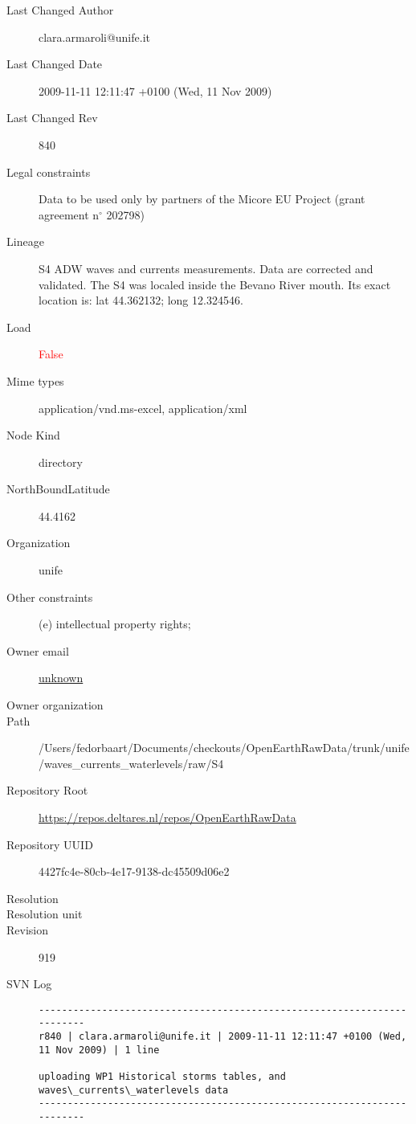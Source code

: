 \documentclass[9]{report}
\begin{document}
\begin{description}
  \item[Last Changed Author] clara.armaroli@unife.it
  \item[Last Changed Date] 2009-11-11 12:11:47 +0100 (Wed, 11 Nov 2009)
  \item[Last Changed Rev] 840
  \item[Legal constraints] Data to be used only by partners of the Micore EU Project (grant agreement n\mbox{$^\circ$} 202798)
  \item[Lineage] S4 ADW waves and currents measurements. Data are corrected and validated. The S4 was localed inside the Bevano River mouth. Its exact location is: lat 44.362132; long 12.324546.
  \item[Load] \textcolor{red}{False}
  \item[Mime types] application/vnd.ms-excel, application/xml
  \item[Node Kind] directory
  \item[NorthBoundLatitude] 44.4162
  \item[Organization] unife
  \item[Other constraints] (e) intellectual property rights;
  \item[Owner email] \href{mailto:unknown}{unknown}
  \item[Owner organization] 
  \item[Path] /Users/fedorbaart/Documents/checkouts/OpenEarthRawData/trunk/unife/waves\_currents\_waterlevels/raw/S4
  \item[Repository Root] \href{https://repos.deltares.nl/repos/OpenEarthRawData}{https://repos.deltares.nl/repos/OpenEarthRawData}
  \item[Repository UUID] 4427fc4e-80cb-4e17-9138-dc45509d06e2
  \item[Resolution] 
  \item[Resolution unit] 
  \item[Revision] 919
  \item[SVN Log] \begin{verbatim}
------------------------------------------------------------------------
r840 | clara.armaroli@unife.it | 2009-11-11 12:11:47 +0100 (Wed, 11 Nov 2009) | 1 line

uploading WP1 Historical storms tables, and waves\_currents\_waterlevels data
------------------------------------------------------------------------


\end{verbatim}
\end{description}
\end{document}
